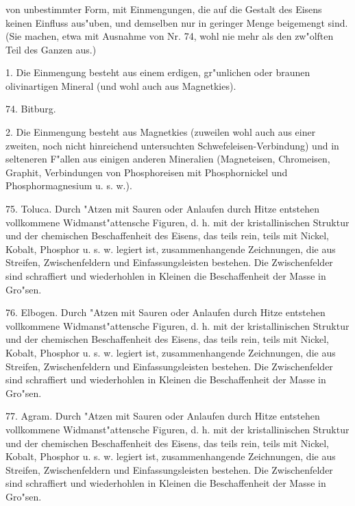 \documentclass[a4paper, 11pt, oneside, polutonikogreek, german]{article}
\begin{document}
\subsubsection[\frakfamily{Derbes Meteoreisen.}]{}
von unbestimmter Form, mit Einmengungen, die auf die Gestalt des Eisens keinen Einfluss aus"uben, und demselben nur in geringer Menge beigemengt sind. (Sie machen, etwa mit Ausnahme von Nr. 74, wohl nie mehr als den zw"olften Teil des Ganzen aus.)

\vspace{2ex}

1. Die Einmengung besteht aus einem erdigen, gr"unlichen oder braunen olivinartigen Mineral (und wohl auch aus Magnetkies).

\vspace{2ex}

74. Bitburg.

\vspace{2ex}

2. Die Einmengung besteht aus Magnetkies (zuweilen wohl auch aus einer zweiten, noch nicht hinreichend untersuchten Schwefeleisen-Verbindung) und in selteneren F"allen aus einigen anderen Mineralien (Magneteisen, Chromeisen, Graphit, Verbindungen von Phosphoreisen mit Phosphornickel und Phosphormagnesium u. s. w.).

\vspace{2ex}

75. Toluca. Durch "Atzen mit Sauren oder Anlaufen durch Hitze entstehen vollkommene Widmanst"attensche Figuren, d. h. mit der kristallinischen Struktur und der chemischen Beschaffenheit des Eisens, das teils rein, teils mit Nickel, Kobalt, Phosphor u. s. w. legiert ist, zusammenhangende Zeichnungen, die aus Streifen, Zwischenfeldern und Einfassungsleisten bestehen. Die Zwischenfelder sind schraffiert und wiederhohlen in Kleinen die Beschaffenheit der Masse in Gro"sen.

76. Elbogen. Durch "Atzen mit Sauren oder Anlaufen durch Hitze entstehen vollkommene Widmanst"attensche Figuren, d. h. mit der kristallinischen Struktur und der chemischen Beschaffenheit des Eisens, das teils rein, teils mit Nickel, Kobalt, Phosphor u. s. w. legiert ist, zusammenhangende Zeichnungen, die aus Streifen, Zwischenfeldern und Einfassungsleisten bestehen. Die Zwischenfelder sind schraffiert und wiederhohlen in Kleinen die Beschaffenheit der Masse in Gro"sen.

77. Agram. Durch "Atzen mit Sauren oder Anlaufen durch Hitze entstehen vollkommene Widmanst"attensche Figuren, d. h. mit der kristallinischen Struktur und der chemischen Beschaffenheit des Eisens, das teils rein, teils mit Nickel, Kobalt, Phosphor u. s. w. legiert ist, zusammenhangende Zeichnungen, die aus Streifen, Zwischenfeldern und Einfassungsleisten bestehen. Die Zwischenfelder sind schraffiert und wiederhohlen in Kleinen die Beschaffenheit der Masse in Gro"sen.
\end{document}
